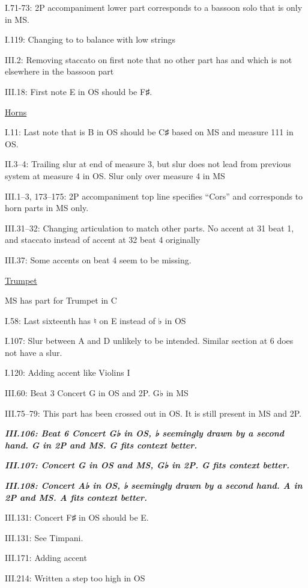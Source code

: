 \documentclass[twoside]{article}
\newcommand\dynmark[1]{\scalebox{0.9}{#1}{\kern1pt}}
\begin{document}
\begin{hangparas}{15pt}{1}
\begin{multicols}{2}
I.71-73: 2P accompaniment lower part corresponds to a bassoon solo that is only in MS.

I.119: Changing \dynmark{\f} to \dynmark{\ff} to balance with low strings

III.2: Removing staccato on first note that no other part has and which is not elsewhere in the bassoon part

III.18: First note E in OS should be F♯.

\underline{Horns}

I.11: Last note that is B in OS should be C♯ based on MS and measure 111 in OS.

II.3--4: Trailing slur at end of measure 3, but slur does not lead from previous system at measure 4 in OS. Slur only over measure 4 in MS

III.1--3, 173--175: 2P accompaniment top line specifies ``Cors'' and corresponds to horn parts in MS only.

III.31--32: Changing articulation to match other parts. No accent at 31 beat 1, and staccato instead of accent at 32 beat 4 originally

III.37: Some accents on beat 4 seem to be missing.

\underline{Trumpet}

MS has part for Trumpet in C

I.58: Last sixteenth has ♮ on E instead of ♭ in OS

I.107: Slur between A and D unlikely to be intended. Similar section at 6 does not have a slur.

I.120: Adding accent like Violins I

III.60: Beat 3 Concert G in OS and 2P. G♭ in MS

III.75--79: This part has been crossed out in OS. It is still present in MS and 2P.

\textbf{\textit{III.106: Beat 6 Concert G♭ in OS, ♭ seemingly drawn by a second hand. G in 2P and MS. G fits context better.}}

\textbf{\textit{III.107: Concert G in OS and MS, G♭ in 2P. G fits context better.}}

\textbf{\textit{III.108: Concert A♭ in OS, ♭ seemingly drawn by a second hand. A in 2P and MS. A fits context better.}}

III.131: Concert F♯ in OS should be E.

III.131: See Timpani.

III.171: Adding accent

III.214: Written a step too high in OS


\end{multicols}
\end{hangparas}
\end{document}
